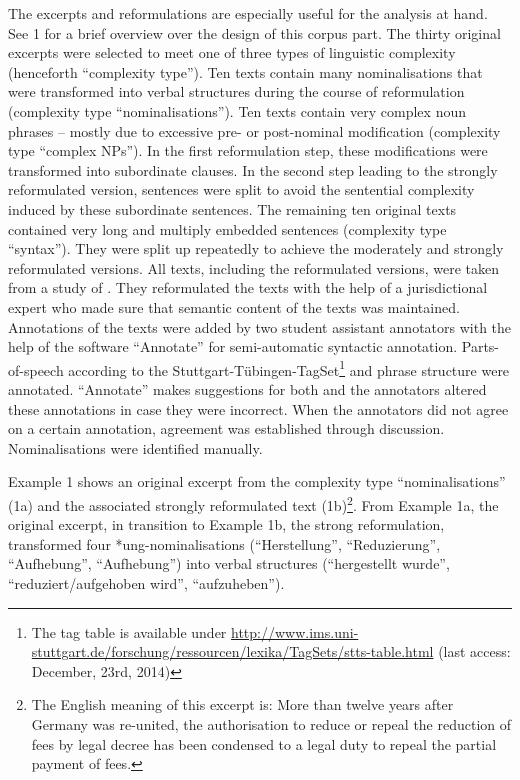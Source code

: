 \documentclass[output=paper]{langsci/langscibook}
\begin{document}
The excerpts and reformulations are especially useful for the analysis at hand. See 1 for a brief overview over the design of this corpus part. The thirty original excerpts were selected to meet one of three types of linguistic complexity (henceforth “complexity type”). Ten texts contain many nominalisations that were transformed into verbal structures during the course of reformulation (complexity type “nominalisations”). Ten texts contain very complex noun phrases – mostly due to excessive pre- or post-nominal modification (complexity type “complex NPs”). In the first reformulation step, these modifications were transformed into subordinate clauses. In the second step leading to the strongly reformulated version, sentences were split to avoid the sentential complexity induced by these subordinate sentences. The remaining ten original texts contained very long and multiply embedded sentences (complexity type “syntax”). They were split up repeatedly to achieve the moderately and strongly reformulated versions. All texts, including the reformulated versions, were taken from a study of \citet{Hansen2006}. They reformulated the texts with the help of a jurisdictional expert who made sure that semantic content of the texts was maintained. Annotations of the texts were added by two student assistant annotators with the help of the software “Annotate” \citep{Plaehn1998} for semi-automatic syntactic annotation. Parts-of-speech according to the Stuttgart-Tübingen-TagSet\footnote{The tag table is available under \url{http://www.ims.uni-stuttgart.de/forschung/ressourcen/lexika/TagSets/stts-table.html} (last access: December, 23rd, 2014)} and phrase structure were annotated. “Annotate” makes suggestions for both and the annotators altered these annotations in case they were incorrect. When the annotators did not agree on a certain annotation, agreement was established through discussion. Nominalisations were identified manually.

Example 1 shows an original excerpt from the complexity type “nominalisations” (1a) and the associated strongly reformulated text (1b)\footnote{The English meaning of this excerpt is: More than twelve years after Germany was re-united, the authorisation to reduce or repeal the reduction of fees by legal decree has been condensed to a legal duty to repeal the partial payment of fees.}. From Example 1a, the original excerpt, in transition to Example 1b, the strong reformulation, \citet{Hansen2006} transformed four *ung-nominalisations (“Herstellung”, “Reduzierung”, “Aufhebung”, “Aufhebung”) into verbal structures (“hergestellt wurde”, “reduziert/aufgehoben wird”, “aufzuheben”).
\end{document}
